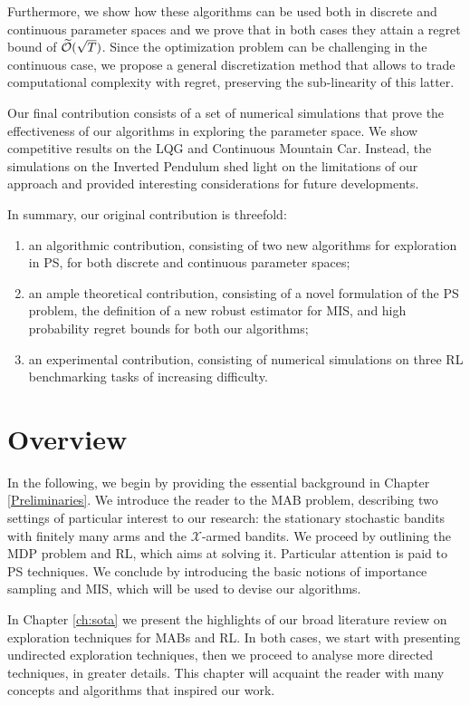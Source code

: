 Furthermore, we show how these algorithms can be used both in discrete and continuous parameter spaces and we prove that in both cases they attain a regret bound of $\widetilde{\mathcal{O}}(\sqrt{T})$. Since the optimization problem can be challenging in the continuous case, we propose a general discretization method that allows to trade computational complexity with regret, preserving the sub-linearity of this latter.

Our final contribution consists of a set of numerical simulations that prove the effectiveness of our algorithms in exploring the parameter space. We show competitive results on the \gls{LQG} and Continuous Mountain Car. Instead, the simulations on the Inverted Pendulum shed light on the limitations of our approach and provided interesting considerations for future developments.

In summary, our original contribution is threefold:
\begin{enumerate}
\item an algorithmic contribution, consisting of two new algorithms for exploration in \gls{PS}, for both discrete and continuous parameter spaces;
\item an ample theoretical contribution, consisting of a novel formulation of the \gls{PS} problem, the definition of a new robust estimator for \gls{MIS}, and high probability regret bounds for both our algorithms;
\item an experimental contribution, consisting of numerical simulations on three \gls{RL} benchmarking tasks of increasing difficulty.
\end{enumerate}

\section{Overview}

In the following, we begin by providing the essential background in Chapter \ref{Preliminaries}. We introduce the reader to the \gls{MAB} problem, describing two settings of particular interest to our research: the stationary stochastic bandits with finitely many arms and the $\mathcal{X}$-armed bandits. We proceed by outlining the \gls{MDP} problem and \gls{RL}, which aims at solving it. Particular attention is paid to \gls{PS} techniques. We conclude by introducing the basic notions of importance sampling and \gls{MIS}, which will be used to devise our algorithms.

In Chapter \ref{ch:sota} we present the highlights of our broad literature review on exploration techniques for \gls{MAB}s and \gls{RL}. In both cases, we start with presenting undirected exploration techniques, then we proceed to analyse more directed techniques, in greater details. This chapter will acquaint the reader with many concepts and algorithms that inspired our work.

